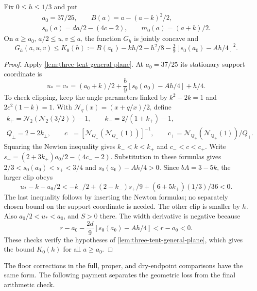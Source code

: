 \begin{lemma}\label{lem:full-three-tent-critical}
Fix $0\le h\le1/3$ and put
\[
 \begin{gathered}
 a_0=37/25,\qquad B(a)=a-(a-k)^2/2,\\
 s_0(a)=da/2-(4c-2),\qquad m_0(a)=(a+k)/2.
 \end{gathered}
\]
On $a\ge a_0$, $a/2\le u,v\le a$, the function $G_h$ is
jointly concave and
\begin{equation}\label{eq:three-tent-supporting-plane}
 G_h(a,u,v)\le
 K_0(h):=B(a_0)-kh/2-h^2/8
             -\tfrac29[s_0(a_0)-Ah/4]^2.
\end{equation}
\end{lemma}
\begin{proof}
Apply \cref{lem:three-tent-general-plane}. At $a_0=37/25$ its
stationary support coordinate is
\[
 u_*=v_*=(a_0+k)/2+\frac b9[s_0(a_0)-Ah/4]+h/4.
\]
To check clipping, keep the angle parameters linked by
$k^2+2k=1$ and $2c^2(1-k)=1$. With
$\mathcal N_q(x)=(x+q/x)/2$, define
\begin{equation}\label{eq:triangle-newton-parameters}
 \begin{gathered}
 k_+=\mathcal N_2(\mathcal N_2(3/2))-1,
 \qquad k_-=2/(1+k_+)-1,\\
 Q_\pm=2-2k_\pm,\qquad
 c_-=[\mathcal N_{Q_-}(\mathcal N_{Q_-}(1))]^{-1},\qquad
 c_+=\mathcal N_{Q_+}(\mathcal N_{Q_+}(1))/Q_+.
 \end{gathered}
\end{equation}
Squaring the Newton inequality gives $k_-<k<k_+$ and
$c_-<c<c_+$. Write
$s_+=(2+3k_+)a_0/2-(4c_--2)$.
Substitution in these formulas gives $2/3<s_0(a_0)<s_+<3/4$
and $s_0(a_0)-Ah/4>0$. Since $bA=3-5k$, the larger clip obeys
\[
 u_*-k-a_0/2
 <-k_-/2+(2-k_-)s_+/9+(6+5k_+)(1/3)/36<0.
\]
The last inequality follows by inserting the Newton formulas;
no separately chosen bound on the support coordinate is needed.
The other clip is smaller by $h$.
Also $a_0/2<u_*<a_0$, and $S>0$ there.
The width derivative is negative because
\[
 r-a_0-\frac{2d}{9}[s_0(a_0)-Ah/4]<r-a_0<0.
\]
These checks verify the hypotheses of
\cref{lem:three-tent-general-plane}, which gives the bound $K_0(h)$
for all $a\ge a_0$.
\end{proof}

The floor corrections in the full, proper, and dry-endpoint comparisons
have the same form. The following payment separates the geometric loss
from the final arithmetic check.

